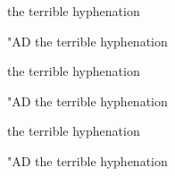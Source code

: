 \documentclass{book}
\begin{document}
the terrible 
hyphenation

\prehyphenchar"AD
the terrible 
hyphenation


the terrible 
hyphenation

\prehyphenchar"AD
the terrible 
hyphenation

the terrible 
hyphenation

\prehyphenchar"AD
the terrible 
hyphenation
\end{document}
